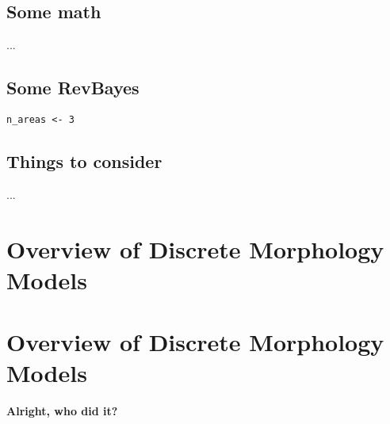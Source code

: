 \subsection{Some math}

...

\subsection{Some RevBayes}

\begin{snugshade}
\begin{lstlisting}
n_areas <- 3
\end{lstlisting}
\end{snugshade}


\subsection{Things to consider}

...


\section{Overview of Discrete Morphology Models} \label{sec:dm_simple}

\section{Overview of Discrete Morphology Models} \label{sec:dm_complex}
{\bf {} Alright, who did it?}

\newpage
